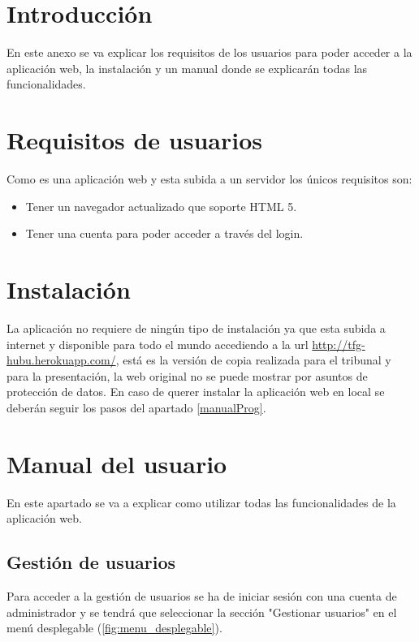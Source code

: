 
\section{Introducción}

En este anexo se va explicar los requisitos de los usuarios para poder acceder a la aplicación web, la instalación y un manual donde se explicarán todas las funcionalidades.

\section{Requisitos de usuarios}

Como es una aplicación web y esta subida a un servidor los únicos requisitos son:
\begin{itemize}
    \item Tener un navegador actualizado que soporte HTML 5.
    \item Tener una cuenta para poder acceder a través del login.
\end{itemize}

\section{Instalación}

La aplicación no requiere de ningún tipo de instalación ya que esta subida a internet y disponible para todo el mundo accediendo a la url \url{http://tfg-hubu.herokuapp.com/}, está es la versión de copia realizada para el tribunal y para la presentación, la web original no se puede mostrar por asuntos de protección de datos. En caso de querer instalar la aplicación web en local se deberán seguir los pasos del apartado \ref{manualProg}.

\section{Manual del usuario}

En este apartado se va a explicar como utilizar todas las funcionalidades de la aplicación web.

\subsection{Gestión de usuarios}

Para acceder a la gestión de usuarios se ha de iniciar sesión con una cuenta de administrador y se tendrá que seleccionar la sección "Gestionar usuarios"{} en el menú desplegable (\ref{fig:menu_desplegable}).

